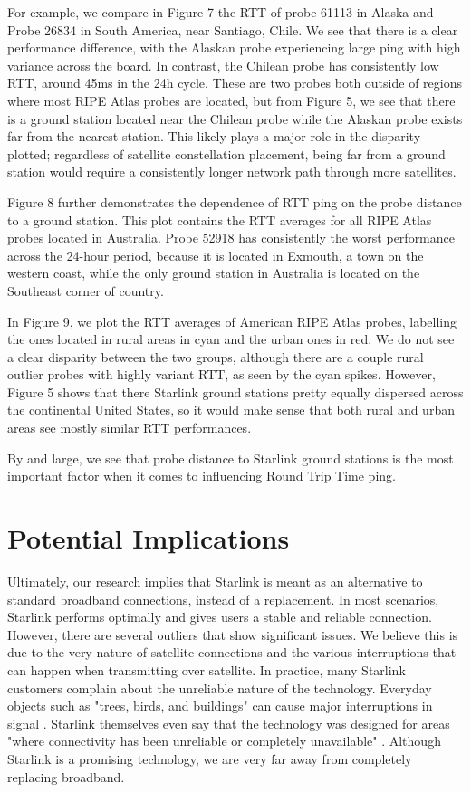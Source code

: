 \documentclass[acmsmall]{acmart}
\begin{document}
For example, we compare in Figure 7 the RTT of probe 61113 in Alaska and Probe 26834 in South America, near Santiago, Chile. We see that there is a clear performance difference, with the Alaskan probe experiencing large ping with high variance across the board. In contrast, the Chilean probe has consistently low RTT, around 45ms in the 24h cycle. These are two probes both outside of regions where most RIPE Atlas probes are located, but from Figure 5, we see that there is a ground station located near the Chilean probe while the Alaskan probe exists far from the nearest station. This likely plays a major role in the disparity plotted; regardless of satellite constellation placement, being far from a ground station would require a consistently longer network path through more satellites.

Figure 8 further demonstrates the dependence of RTT ping on the probe distance to a ground station. This plot contains the RTT averages for all RIPE Atlas probes located in Australia. Probe 52918 has consistently the worst performance across the 24-hour period, because it is located in Exmouth, a town on the western coast, while the only ground station in Australia is located on the Southeast corner of country. 

In Figure 9, we plot the RTT averages of American RIPE Atlas probes, labelling the ones located in rural areas in cyan and the urban ones in red. We do not see a clear disparity between the two groups, although there are a couple rural outlier probes with highly variant RTT, as seen by the cyan spikes. However, Figure 5 shows that there Starlink ground stations pretty equally dispersed across the continental United States, so it would make sense that both rural and urban areas see mostly similar RTT performances. 

By and large, we see that probe distance to Starlink ground stations is the most important factor when it comes to influencing Round Trip Time ping. 

\section{Potential Implications}

Ultimately, our research implies that Starlink is meant as an alternative to standard broadband connections, instead of a replacement. In most scenarios, Starlink performs optimally and gives users a stable and reliable connection. However, there are several outliers that show significant issues. We believe this is due to the very nature of satellite connections and the various interruptions that can happen when transmitting over satellite. In practice, many Starlink customers complain about the unreliable nature of the technology. Everyday objects such as "trees, birds, and buildings" can cause major interruptions in signal \cite{Verge}. Starlink themselves even say that the technology was designed for areas  "where connectivity has been unreliable or completely unavailable" \cite{Starlink}. Although Starlink is a promising technology, we are very far away from completely replacing broadband.
\end{document}
